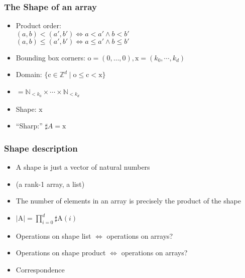 \documentclass[xetex,mathserif,serif]{beamer}
\newcommand\mrm[1]{\mathrm{#1}}
\newcommand\brm[1]{\bm{\mrm{#1}}}
\newcommand\Nat{\mathbb{N}}
\newcommand\Zheil{\mathbb{Z}}
\begin{document}
\begin{frame}
  \frametitle{The Shape of an array}
  \begin{itemize}%
    \item Product order:\\
      \((a, b) < (a', b') \iff a < a' \land b < b'\)\\
      \((a, b) \le (a', b') \iff a \le a' \land b \le b'\)
    \item Bounding box corners: \(\brm o = (0, \dots, 0), \brm x = (k_0, \cdots, k_d)\)
    \item Domain: \(\{\brm c \in \Zheil^d \mid \brm o \le \brm c < \brm x\}\)
    \item \(= \Nat_{<k_0} \times \cdots \times \Nat_{<k_d}\)
    \item Shape: \(\brm x\)
    \item ``Sharp:'' \(\sharp A = \brm x\)
  \end{itemize}
\end{frame}

\begin{frame}
  \frametitle{Shape description}
  \begin{itemize}%
    \item A shape is just a vector of natural numbers
    \item (a rank-1 array, a list)
    \item The number of elements in an array is precisely the
      product of the shape
    \item \(|\brm A| = \prod_{i=0}^d \sharp \brm A (i)\)
    \item Operations on shape list \(\iff\) operations on arrays?
    \item Operations on shape product \(\iff\) operations on arrays?
    \item Correspondence
  \end{itemize}
\end{frame}
\end{document}
